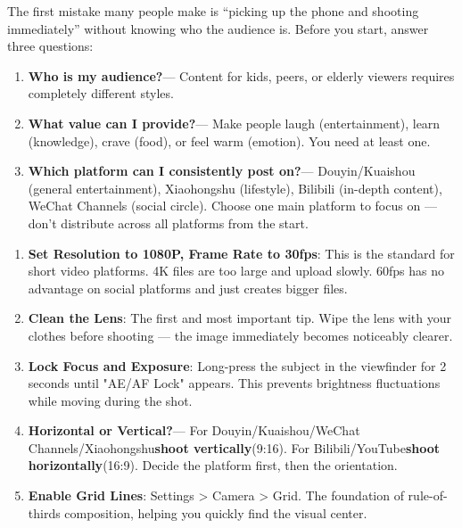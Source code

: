 


The first mistake many people make is “picking up the phone and shooting immediately” without knowing who the audience is. Before you start, answer three questions:

\begin{enumerate}
  \item \textbf{Who is my audience?}— Content for kids, peers, or elderly viewers requires completely different styles.
  \item \textbf{What value can I provide?}— Make people laugh (entertainment), learn (knowledge), crave (food), or feel warm (emotion). You need at least one.
  \item \textbf{Which platform can I consistently post on?}— Douyin/Kuaishou (general entertainment), Xiaohongshu (lifestyle), Bilibili (in-depth content), WeChat Channels (social circle). Choose one main platform to focus on — don't distribute across all platforms from the start.
\end{enumerate}


\begin{enumerate}
  \item \textbf{Set Resolution to 1080P, Frame Rate to 30fps}: This is the standard for short video platforms. 4K files are too large and upload slowly. 60fps has no advantage on social platforms and just creates bigger files.
  \item \textbf{Clean the Lens}: The first and most important tip. Wipe the lens with your clothes before shooting — the image immediately becomes noticeably clearer.
  \item \textbf{Lock Focus and Exposure}: Long-press the subject in the viewfinder for 2 seconds until "AE/AF Lock" appears. This prevents brightness fluctuations while moving during the shot.
  \item \textbf{Horizontal or Vertical?}— For Douyin/Kuaishou/WeChat Channels/Xiaohongshu\textbf{shoot vertically}(9:16). For Bilibili/YouTube\textbf{shoot horizontally}(16:9). Decide the platform first, then the orientation.
  \item \textbf{Enable Grid Lines}: Settings > Camera > Grid. The foundation of rule-of-thirds composition, helping you quickly find the visual center.
\end{enumerate}

